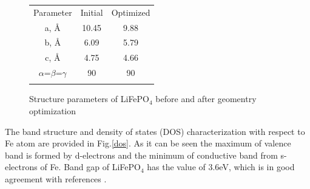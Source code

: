 \documentclass[11pt]{article}
\begin{document}
\begin{figure}[H]
\begin{minipage}[h]{0.5\linewidth}
\begin{tabular}{ccc}
Parameter & Initial & Optimized \\
a, \AA & 10.45 & 9.88 \\
b, \AA & 6.09 & 5.79 \\
c, \AA & 4.75 & 4.66 \\
$\alpha$=$\beta$=$\gamma$ & 90 & 90 \\
& & \\
\end{tabular}
\end{minipage}
\hfill
\begin{minipage}[h]{0.35\linewidth}
\end{minipage}
\caption{Structure parameters of LiFePO$_4$ before and after geomentry optimization}
\label{tabular:str}
\end{figure}

The band structure and density of states (DOS) characterization with respect to Fe atom are provided in Fig.\ref{dos}. As it can be seen the maximum of valence band is formed by d-electrons and the minimum of conductive band from s-electrons of Fe. Band gap of LiFePO$_4$ has the value of 3.6eV, which is in good agreement with references \cite{bgap}.
\end{document}
